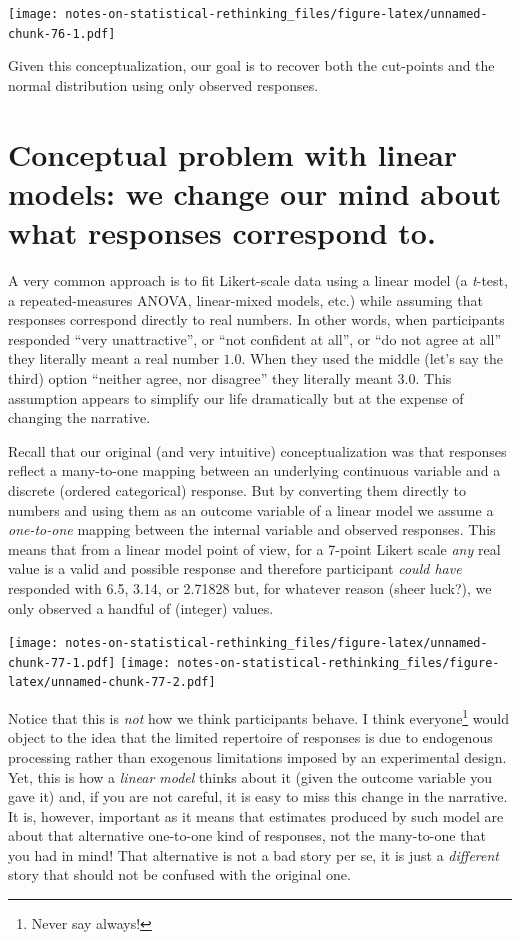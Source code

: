 \documentclass[
]{book}
\begin{document}
\texttt{[image: notes-on-statistical-rethinking\_files/figure-latex/unnamed-chunk-76-1.pdf]}

Given this conceptualization, our goal is to recover both the cut-points and the normal distribution using only observed responses.

\hypertarget{conceptual-problem-with-linear-models-we-change-our-mind-about-what-responses-correspond-to.}{%
\section{Conceptual problem with linear models: we change our mind about what responses correspond to.}\label{conceptual-problem-with-linear-models-we-change-our-mind-about-what-responses-correspond-to.}}

A very common approach is to fit Likert-scale data using a linear model (a \emph{t}-test, a repeated-measures ANOVA, linear-mixed models, etc.) while assuming that responses correspond directly to real numbers. In other words, when participants responded ``very unattractive'', or ``not confident at all'', or ``do not agree at all'' they literally meant a real number \(1.0\). When they used the middle (let's say the third) option ``neither agree, nor disagree'' they literally meant \(3.0\). This assumption appears to simplify our life dramatically but at the expense of changing the narrative.

Recall that our original (and very intuitive) conceptualization was that responses reflect a many-to-one mapping between an underlying continuous variable and a discrete (ordered categorical) response. But by converting them directly to numbers and using them as an outcome variable of a linear model we assume a \emph{one-to-one} mapping between the internal variable and observed responses. This means that from a linear model point of view, for a 7-point Likert scale \emph{any} real value is a valid and possible response and therefore participant \emph{could have} responded with 6.5, 3.14, or 2.71828 but, for whatever reason (sheer luck?), we only observed a handful of (integer) values.

\texttt{[image: notes-on-statistical-rethinking\_files/figure-latex/unnamed-chunk-77-1.pdf]} \texttt{[image: notes-on-statistical-rethinking\_files/figure-latex/unnamed-chunk-77-2.pdf]}

Notice that this is \emph{not} how we think participants behave. I think everyone\footnote{Never say always!} would object to the idea that the limited repertoire of responses is due to endogenous processing rather than exogenous limitations imposed by an experimental design. Yet, this is how a \emph{linear model} thinks about it (given the outcome variable you gave it) and, if you are not careful, it is easy to miss this change in the narrative. It is, however, important as it means that estimates produced by such model are about that alternative one-to-one kind of responses, not the many-to-one that you had in mind! That alternative is not a bad story per se, it is just a \emph{different} story that should not be confused with the original one.
\end{document}
